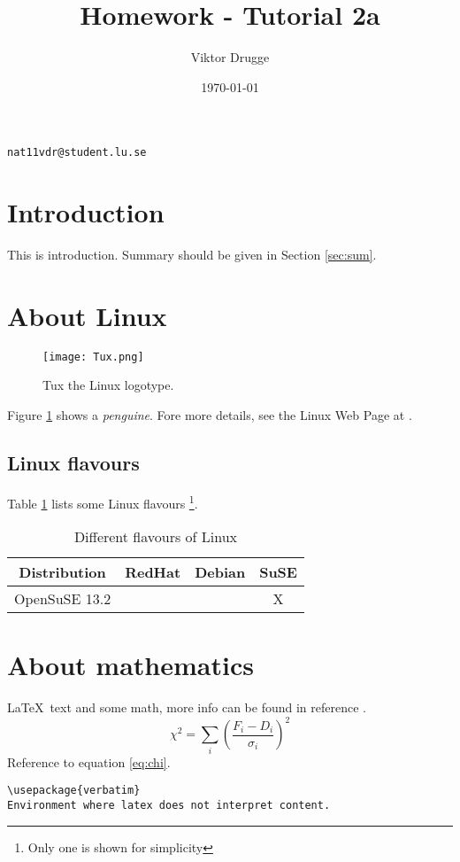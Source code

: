 \documentclass[a4paper,12pt,twoside]{article}
\author{Viktor Drugge}
\title{Homework - Tutorial 2a}
\date{\today}
\begin{document}
\maketitle

\begin{center}
  \texttt{nat11vdr@student.lu.se}
\end{center}

\section{Introduction}
\label{sec:intro}
This is introduction. Summary should be given in Section \ref{sec:sum}.

\section{About Linux}
\label{sec:linux}
\begin{figure}[htb]
  \centering
  \texttt{[image: Tux.png]}
  \caption{Tux the Linux logotype.}
  \label{fig:tux}
\end{figure}
Figure \ref{fig:tux} shows a \textit{penguine}. Fore more details, see the
Linux Web Page at \cite{linux}.

\subsection{Linux flavours}
\label{sec:flavorflave}
Table \ref{tab:flavorflave} lists some Linux flavours \footnote{Only one is
  shown for simplicity}.
\begin{table}[h]
  \centering
  \begin{tabular}{c|c|c|c}
    \textbf{Distribution} & RedHat & Debian & SuSE\\
    \hline\hline
    OpenSuSE 13.2 & & & X\\
    \hline
  \end{tabular}
  \caption{Different flavours of Linux}
  \label{tab:flavorflave}
\end{table}

\section{About mathematics}
\label{sec:math}
\LaTeX\ text and some math, more info can be found in reference \cite{latex}.
\begin{equation}
  \chi^2=\sum_i\left(\frac{F_i-D_i}{\sigma_i} \right)^2\label{eq:chi}
\end{equation}
Reference to equation \eqref{eq:chi}.
\begin{verbatim}
\usepackage{verbatim}
Environment where latex does not interpret content.
\end{verbatim}
\end{document}
